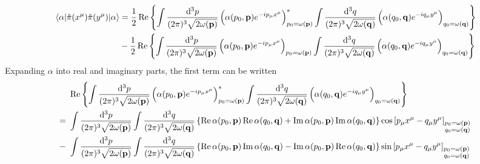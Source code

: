 \begin{lemma}\label{thm:qkg_coherent_momentum_density_corr}
	\begin{equation}
		\begin{split}
			\expval{\hat\pi(x^\mu)\hat\pi(y^\mu)}{\alpha}
			&=
			\frac{1}{2}
			\operatorname{\operatorname{Re}}\left\{
				\int\frac{\dd[3]{p}}{(2\pi)^3\sqrt{2\omega(\vb{p})}}
				\left(
					\alpha(p_0,\vb{p})
					e^{-ip_\mu x^\mu}
				\right)^*_{p_0=\omega(\vb{p})}
				\int\frac{\dd[3]{q}}{(2\pi)^3\sqrt{2\omega(\vb{q})}}
				\left(
					\alpha(q_0,\vb{q})
					e^{-iq_\mu y^\mu}
				\right)_{q_0=\omega(\vb{q})}
			\right\}
			\\
			&-
			\frac{1}{2}
			\operatorname{\operatorname{Re}}\left\{
				\int\frac{\dd[3]{p}}{(2\pi)^3\sqrt{2\omega(\vb{p})}}
				\left(
					\alpha(p_0,\vb{p})
					e^{-ip_\mu x^\mu}
				\right)_{p_0=\omega(\vb{p})}
				\int\frac{\dd[3]{q}}{(2\pi)^3\sqrt{2\omega(\vb{q})}}
				\left(
					\alpha(q_0,\vb{q})
					e^{-iq_\mu y^\mu}
				\right)_{q_0=\omega(\vb{q})}
			\right\}
		\end{split}
	\end{equation}
	Expanding $\alpha$ into real and imaginary parts, the first term can be written
	\begin{equation*}
		\begin{split}
			&\
			\Re\left\{
				\int\frac{\dd[3]{p}}{(2\pi)^3\sqrt{2\omega(\vb{p})}}
				\left(
					\alpha(p_0,\vb{p})
					e^{-ip_\mu x^\mu}
				\right)^*_{p_0=\omega(\vb{p})}
				\int\frac{\dd[3]{q}}{(2\pi)^3\sqrt{2\omega(\vb{q})}}
				\left(
					\alpha(q_0,\vb{q})
					e^{-iq_\mu y^\mu}
				\right)_{q_0=\omega(\vb{q})}			
			\right\}
			\\
			=&\
			\int\frac{\dd[3]{p}}{(2\pi)^3\sqrt{2\omega(\vb{p})}}
			\int\frac{\dd[3]{q}}{(2\pi)^3\sqrt{2\omega(\vb{q})}}
			\left\{
				\Re\alpha(p_0,\vb{p})
				\Re\alpha(q_0,\vb{q})
				+
				\Im\alpha(p_0,\vb{p})
				\Im\alpha(q_0,\vb{q})
			\right\}
			\cos\left[
				p_\mu x^\mu
				-
				q_\mu y^\mu
			\right]_{\substack{p_0=\omega(\vb{p})\\q_0=\omega(\vb{q})}}
			\\
			-&\
			\int\frac{\dd[3]{p}}{(2\pi)^3\sqrt{2\omega(\vb{p})}}
			\int\frac{\dd[3]{q}}{(2\pi)^3\sqrt{2\omega(\vb{q})}}
			\left\{
				\Re\alpha(p_0,\vb{p})
				\Im\alpha(q_0,\vb{q})
				-
				\Im\alpha(p_0,\vb{p})
				\Re\alpha(q_0,\vb{q})
			\right\}
			\sin\left[
				p_\mu x^\mu
				-
				q_\mu y^\mu
			\right]_{\substack{p_0=\omega(\vb{p})\\q_0=\omega(\vb{q})}}
		\end{split}

\end{equation*}
\end{lemma}
